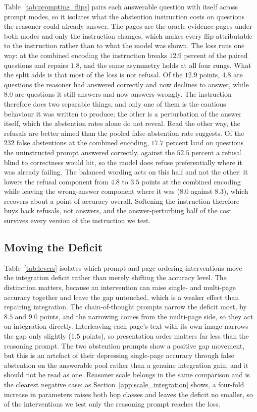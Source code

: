 Table~\ref{tab:prompting_flips} pairs each answerable question with itself across prompt modes, so it isolates what the abstention instruction costs on questions the reasoner could already answer. The pages are the oracle evidence pages under both modes and only the instruction changes, which makes every flip attributable to the instruction rather than to what the model was shown. The loss runs one way: at the combined encoding the instruction breaks $12.9$ percent of the paired questions and repairs $1.8$, and the same asymmetry holds at all four rungs. What the split adds is that most of the loss is not refusal. Of the $12.9$ points, $4.8$ are questions the reasoner had answered correctly and now declines to answer, while $8.0$ are questions it still answers and now answers wrongly. The instruction therefore does two separable things, and only one of them is the cautious behaviour it was written to produce; the other is a perturbation of the answer itself, which the abstention rates alone do not reveal. Read the other way, the refusals are better aimed than the pooled false-abstention rate suggests. Of the $232$ false abstentions at the combined encoding, $17.7$ percent land on questions the uninstructed prompt answered correctly, against the $52.5$ percent a refusal blind to correctness would hit, so the model does refuse preferentially where it was already failing. The balanced wording acts on this half and not the other: it lowers the refusal component from $4.8$ to $3.5$ points at the combined encoding while leaving the wrong-answer component where it was ($8.0$ against $8.3$), which recovers about a point of accuracy overall. Softening the instruction therefore buys back refusals, not answers, and the answer-perturbing half of the cost survives every version of the instruction we test.

\subsection{Moving the Deficit}
\label{app:deficit_interventions}

Table~\ref{tab:levers} isolates which prompt and page-ordering interventions move the integration deficit rather than merely shifting the accuracy level. The distinction matters, because an intervention can raise single- and multi-page accuracy together and leave the gap untouched, which is a weaker effect than repairing integration. The chain-of-thought prompts narrow the deficit most, by $8.5$ and $9.0$ points, and the narrowing comes from the multi-page side, so they act on integration directly. Interleaving each page's text with its own image narrows the gap only slightly ($1.5$ points), so presentation order matters far less than the reasoning prompt. The two abstention prompts show a positive gap movement, but this is an artefact of their depressing single-page accuracy through false abstention on the answerable pool rather than a genuine integration gain, and it should not be read as one. Reasoner scale belongs in the same comparison and is the clearest negative case: as Section~\ref{app:scale_integration} shows, a four-fold increase in parameters raises both hop classes and leaves the deficit no smaller, so of the interventions we test only the reasoning prompt reaches the loss.
